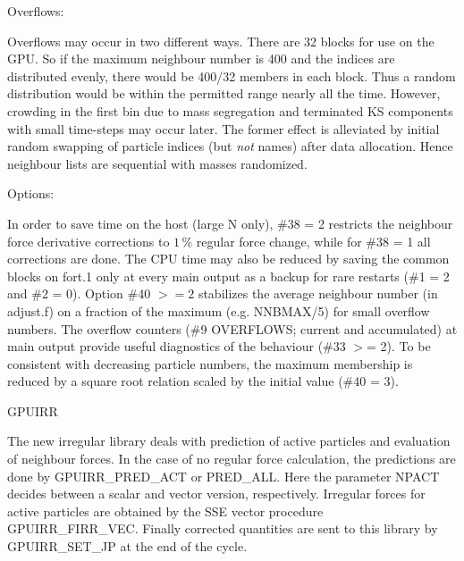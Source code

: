 \documentclass[12pt]{article}
\begin{document}
\medskip
\medskip
\noindent
Overflows:

\medskip
Overflows may occur in two different ways.
There are 32 blocks for use on the GPU.
So if the maximum neighbour number is 400 and the indices are
distributed evenly, there would be 400/32 members in each block.
Thus a random distribution
would be within the permitted range nearly all the time.
However, crowding in the first bin due to mass segregation and
terminated KS components with small time-steps may occur later.
The former effect is alleviated by initial random swapping of particle
indices (but {\it not} names) after data allocation.
Hence neighbour lists are sequential with masses randomized.

\medskip
\medskip
\noindent
Options:

\medskip
In order to save time on the host (large N only), \#38 = 2 restricts the
neighbour force derivative corrections to $1 \,\%$ regular force change,
while for \#38 = 1 all corrections are done.
The CPU time may also be reduced by saving the common blocks on fort.1
only at every main output as a backup for rare restarts (\#1 = 2 and \#2 = 0).
Option \#40 $>= 2$ stabilizes the average neighbour number (in adjust.f)
on a fraction of the maximum (e.g. NNBMAX/5) for small overflow numbers.
The overflow counters (\#9 OVERFLOWS; current and accumulated) at main
output provide useful diagnostics of the behaviour (\#33 $>$= 2).
To be consistent with decreasing particle numbers, the maximum membership
is reduced by a square root relation scaled by the initial value (\#40 = 3).

\medskip
\medskip
\noindent
GPUIRR

\medskip
The new irregular library deals with prediction of active particles and
evaluation of neighbour forces.
In the case of no regular force calculation,
the predictions are done by GPUIRR\_PRED\_ACT or PRED\_ALL.
Here the parameter NPACT decides between a scalar and vector version,
respectively.
Irregular forces for active particles are obtained by the SSE vector
procedure GPUIRR\_FIRR\_VEC.
Finally corrected quantities are sent to this library by GPUIRR\_SET\_JP
at the end of the cycle.
\end{document}
